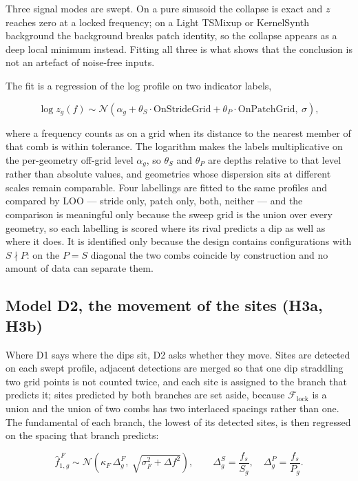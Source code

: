 Three signal modes are swept. On a pure sinusoid the collapse is exact and $z$ reaches zero at a locked frequency; on a Light TSMixup or KernelSynth background the background breaks patch identity, so the collapse appears as a deep local minimum instead. Fitting all three is what shows that the conclusion is not an artefact of noise-free inputs.

The fit is a regression of the log profile on two indicator labels,

\begin{equation*}
\log z_g(f) \sim \mathcal{N}\!\left(
\alpha_g + \theta_S \cdot \text{OnStrideGrid} + \theta_P \cdot \text{OnPatchGrid},\ \sigma
\right),
\end{equation*}

where a frequency counts as on a grid when its distance to the nearest member of that comb is within tolerance. The logarithm makes the labels multiplicative on the per-geometry off-grid level $\alpha_g$, so $\theta_S$ and $\theta_P$ are depths relative to that level rather than absolute values, and geometries whose dispersion sits at different scales remain comparable. Four labellings are fitted to the same profiles and compared by LOO --- stride only, patch only, both, neither --- and the comparison is meaningful only because the sweep grid is the union over every geometry, so each labelling is scored where its rival predicts a dip as well as where it does. It is identified only because the design contains configurations with $S \nmid P$: on the $P=S$ diagonal the two combs coincide by construction and no amount of data can separate them.

\subsection{Model D2, the movement of the sites (H3a, H3b)}

Where D1 says where the dips sit, D2 asks whether they move. Sites are detected on each swept profile, adjacent detections are merged so that one dip straddling two grid points is not counted twice, and each site is assigned to the branch that predicts it; sites predicted by both branches are set aside, because $\mathcal F_{\mathrm{lock}}$ is a union and the union of two combs has two interlaced spacings rather than one. The fundamental of each branch, the lowest of its detected sites, is then regressed on the spacing that branch predicts:

\begin{equation*}
\hat f^{\,F}_{1,g} \sim \mathcal{N}\!\left(
\kappa_F \,\Delta^F_g,\ \sqrt{\sigma_F^2+\Delta f^2}
\right),
\qquad
\Delta^S_g=\frac{f_s}{S_g}, \quad \Delta^P_g=\frac{f_s}{P_g}.
\end{equation*}

